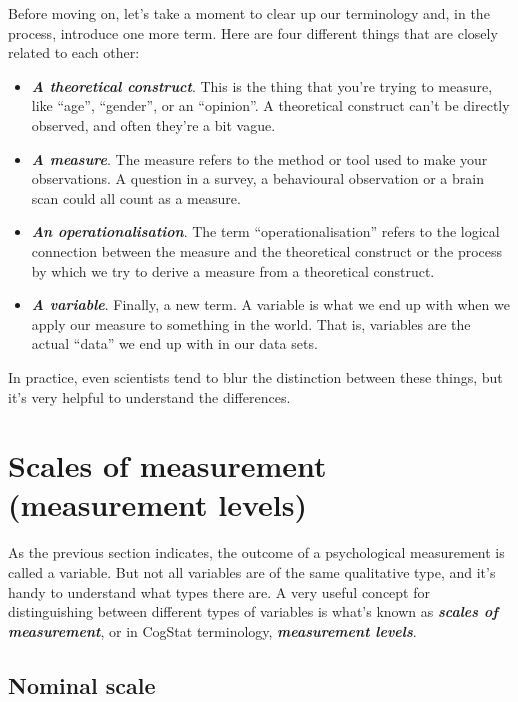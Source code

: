\documentclass[
]{book}
\providecommand{\tightlist}{%
  \setlength{\itemsep}{0pt}\setlength{\parskip}{0pt}}
\theoremstyle{definition}
\theoremstyle{definition}
\theoremstyle{definition}
\theoremstyle{definition}
\theoremstyle{remark}
\begin{document}
Before moving on, let's take a moment to clear up our terminology and, in the process, introduce one more term. Here are four different things that are closely related to each other:

\begin{itemize}
\tightlist
\item
  \textbf{\emph{A theoretical construct}}. This is the thing that you're trying to measure, like ``age'', ``gender'', or an ``opinion''. A theoretical construct can't be directly observed, and often they're a bit vague.
\item
  \textbf{\emph{A measure}}. The measure refers to the method or tool used to make your observations. A question in a survey, a behavioural observation or a brain scan could all count as a measure.
\item
  \textbf{\emph{An operationalisation}}. The term ``operationalisation'' refers to the logical connection between the measure and the theoretical construct or the process by which we try to derive a measure from a theoretical construct.
\item
  \textbf{\emph{A variable}}. Finally, a new term. A variable is what we end up with when we apply our measure to something in the world. That is, variables are the actual ``data'' we end up with in our data sets.
\end{itemize}

In practice, even scientists tend to blur the distinction between these things, but it's very helpful to understand the differences.

\hypertarget{scales}{%
\section{Scales of measurement (measurement levels)}\label{scales}}

As the previous section indicates, the outcome of a psychological measurement is called a variable. But not all variables are of the same qualitative type, and it's handy to understand what types there are. A very useful concept for distinguishing between different types of variables is what's known as \textbf{\emph{scales of measurement}}, or in CogStat terminology, \textbf{\emph{measurement levels}}.

\hypertarget{nominalscale}{%
\subsection{Nominal scale}\label{nominalscale}}
\end{document}

